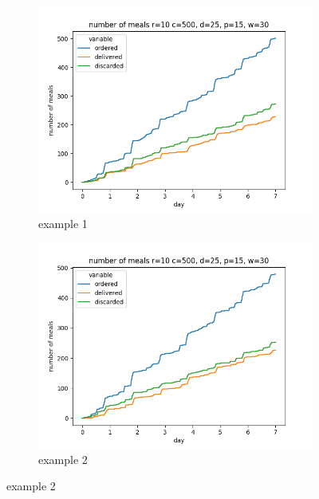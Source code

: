 \begin{center}
    \begin{figure}
        \centering
        \begin{subfigure}[m]{0.30\textwidth}
            \centering
            \includegraphics[width=\textwidth]{sections/run1/week_nd_1_food_ordering_distribution_500_10_25_30}
            \caption{example 1}
        \end{subfigure}
        \hfill
        \begin{subfigure}[m]{0.30\textwidth}
            \centering
            \includegraphics[width=\textwidth]{sections/run1/week_nd_2_food_ordering_distribution_500_10_25_30}
            \caption{example 2}
        \end{subfigure}

\end{figure}
\end{center}
